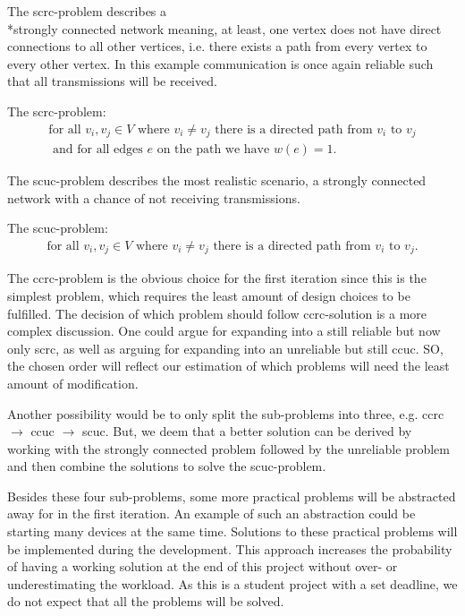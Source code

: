 \noindent The \gls{scrc}-problem describes a \\*strongly connected network meaning, at least, one vertex does not have direct connections to all other vertices, i.e. there exists a path from every vertex to every other vertex. 
In this example communication is once again reliable such that all transmissions will be received. 

\begin{definition}
	The \acrshort{scrc}-problem:
	\begin{align*}
		\text{for all } v_i, v_j \in V \text{ where } v_i \neq v_j \text{ there is a directed path from } v_i \text{ to } v_j\\
		\text{ and for all edges } e \text{ on the path we have } w(e) = 1.
	\end{align*}
\end{definition}

\noindent The \gls{scuc}-problem describes the most realistic scenario, a strongly connected network with a chance of not receiving transmissions. 

\begin{definition}\label{SCUC}
	The \acrshort{scuc}-problem:
	\begin{align*}
		\text{for all } v_i, v_j \in V \text{ where } v_i \neq v_j \text{ there is a directed path from } v_i \text{ to } v_j.%
	\end{align*}
\end{definition}

\bigskip 
\noindent
The \gls{ccrc}-problem is the obvious choice for the first iteration since this is the simplest problem, which requires the least amount of design choices to be fulfilled.
The decision of which problem should follow \gls{ccrc}-solution is a more complex discussion.
One could argue for expanding into a still reliable but now only \acrlong{scrc}, as well as arguing for expanding into an unreliable but still \acrlong{ccuc}.
SO, the chosen order will reflect our estimation of which problems will need the least amount of modification.

Another possibility would be to only split the sub-problems into three, e.g. \gls{ccrc} $\rightarrow$ \gls{ccuc} $\rightarrow$ \gls{scuc}.
But, we deem that a better solution can be derived by working with the strongly connected problem followed by the unreliable problem and then combine the solutions to solve the \gls{scuc}-problem.

Besides these four sub-problems, some more practical problems will be abstracted away for in the first iteration.
An example of such an abstraction could be starting many devices at the same time.
Solutions to these practical problems will be implemented during the development. 
This approach increases the probability of having a working solution at the end of this project without over- or underestimating the workload. 
As this is a student project with a set deadline, we do not expect that all the problems will be solved.

